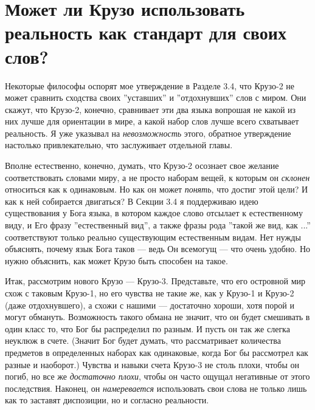 \documentclass[11pt]{book}
\begin{document}
\section{Может ли Крузо использовать реальность как стандарт для своих слов?}

Некоторые философы оспорят мое утверждение в Разделе 3.4, что Крузо-2 не может сравнить сходства своих ''уставших'' и ''отдохнувших'' слов с миром. Они скажут, что Крузо-2, конечно, сравнивает эти два языка вопрошая не какой из них лучше для ориентации в мире, а какой набор слов лучше всего схватывает реальность. Я уже указывал на \textit{невозможность} этого, обратное утверждение настолько привлекательно, что заслуживает отдельной главы.

Вполне естественно, конечно, думать, что Крузо-2 осознает свое желание соответствовать словами миру, а не просто наборам вещей, к которым он \textit{склонен} относиться как к одинаковым. Но как он может \textit{понять}, что достиг этой цели? И как к ней собирается двигаться? В Секции 3.4 я поддерживаю идею существования у Бога языка, в котором каждое слово отсылает к естественному виду, и Его фразу ''естественный вид'', а также фразы рода ''такой же вид, как ...'' соответствуют только реально существующим естественным видам. Нет нужды объяснять, почему язык Бога таков --- ведь Он всемогущ --- что очень удобно. Но нужно объяснить, как может Крузо быть способен на такое.

Итак, рассмотрим нового Крузо --- Крузо-3. Представьте, что его островной мир схож с таковым Крузо-1, но его чувства не такие же, как у Крузо-1 и Крузо-2 (даже отдохнувшего), а схожи с нашими --- достаточно хороши, хотя порой и могут обмануть. Возможность такого обмана не значит, что он будет смешивать в один класс то, что Бог бы распределил по разным. И пусть он так же слегка неуклюж в счете. (Значит Бог будет думать, что рассматривает количества предметов в определенных наборах как одинаковые, когда Бог бы рассмотрел как разные и наоборот.) Чувства и навыки счета Крузо-3 не столь плохи, чтобы он погиб, но все же \textit{достаточно плохи}, чтобы он часто ощущал негативные от этого последствия. Наконец, он \textit{намеревается} использовать свои слова не только лишь как то заставят диспозиции, но и согласно реальности.
\end{document}
